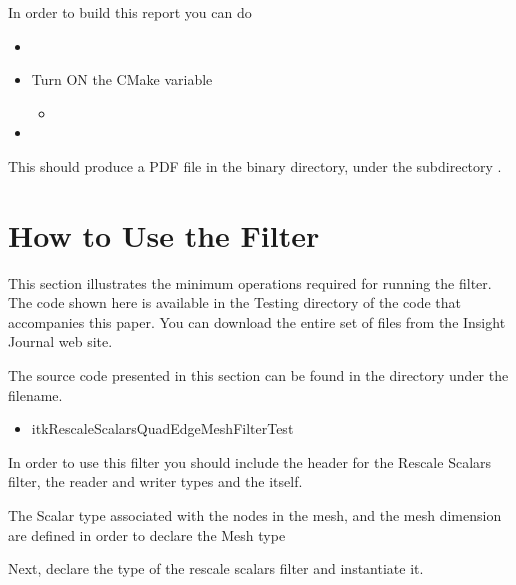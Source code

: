\documentclass{InsightArticle}
\begin{document}
In order to build this report you can do

\begin{itemize}
\item {}
\item Turn ON the CMake variable
\begin{itemize}
\item {}
\end{itemize}
\item {}
\end{itemize}

This should produce a PDF file in the binary directory, under the subdirectory
.

\section{How to Use the Filter}

This section illustrates the minimum operations required for running the filter. The code shown here 
is available in the Testing directory of the code that accompanies this paper. You can download the 
entire set of files from the Insight Journal web site.

The source code presented in this section can be found in the  directory under the filename.

\begin{itemize}
\item itkRescaleScalarsQuadEdgeMeshFilterTest
\end{itemize}

In order to use this filter you should include the header for the Rescale Scalars filter, the reader and writer
types and the  itself.

\begin{center}

\end{center}

The Scalar type associated with the nodes in the mesh, and the mesh dimension
are defined in order to declare the Mesh type

\begin{center}

\end{center}

Next, declare the type of the rescale scalars filter and instantiate it.
\end{document}
